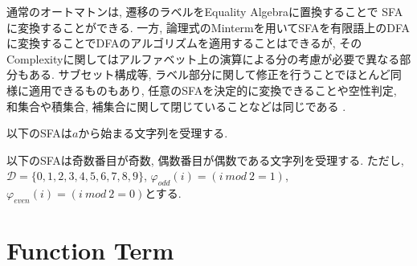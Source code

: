 \documentclass[uplatex,dvipdfmx,a4j]{jsreport}
\begin{document}
  通常のオートマトンは, 遷移のラベルをEquality Algebraに置換することで
  SFAに変換することができる.
  一方, 論理式のMintermを用いてSFAを有限語上のDFAに変換することでDFAのアルゴリズムを適用することはできるが,
  そのComplexityに関してはアルファベット上の演算による分の考慮が必要で異なる部分もある.
  サブセット構成等, ラベル部分に関して修正を行うことでほとんど同様に適用できるものもあり,
  任意のSFAを決定的に変換できることや空性判定, 和集合や積集合, 補集合に関して閉じていることなどは同じである
  \cite{d2017power}.

  \begin{example}
    以下のSFAは$a$から始まる文字列を受理する.
    \begin{center}
    \end{center}
  \end{example}

  \begin{example}
    以下のSFAは奇数番目が奇数, 偶数番目が偶数である文字列を受理する.
    ただし, $\mathcal{D} = \{ 0, 1, 2, 3, 4, 5, 6, 7, 8, 9 \}$,
    $\varphi_{odd}(i) = (i\ mod\ 2 = 1)$, $\varphi_{even}(i) = (i\ mod\ 2 = 0)$とする.
    \begin{center}
    \end{center}
  \end{example}

  \section{Function Term}
\end{document}
